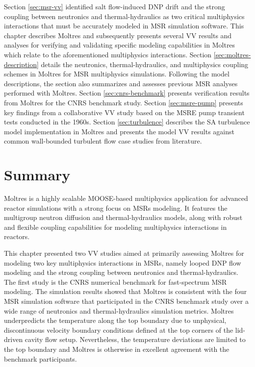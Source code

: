 Section \ref{sec:msr-vv} identified salt flow-induced \gls{DNP} drift and the strong coupling
between neutronics and thermal-hydraulics as two critical multiphysics interactions that must be
accurately modeled in \gls{MSR} simulation software. This chapter describes Moltres and
subsequently presents several \gls{VV} results and analyses for verifying and validating specific
modeling capabilities in Moltres which relate to the aforementioned multiphysics interactions.
Section \ref{sec:moltres-description} details the neutronics, thermal-hydraulics, and multiphysics
coupling schemes in Moltres for \gls{MSR} multiphysics simulations. Following the model
descriptions, the section also summarizes and assesses previous \gls{MSR} analyses
performed with Moltres. Section \ref{sec:cnrs-benchmark} presents verification results from Moltres
for the CNRS benchmark study. Section \ref{sec:msre-pump} presents key findings from a
collaborative \gls{VV} study based on the \gls{MSRE} pump transient tests conducted in the 1960s.
Section \ref{sec:turbulence} describes the \gls{SA} turbulence model implementation in
Moltres and presents the model \gls{VV} results against common wall-bounded turbulent flow case
studies from literature.








\FloatBarrier

\section{Summary}

Moltres is a highly scalable \gls{MOOSE}-based multiphysics application for advanced reactor
simulations with a strong focus on \glspl{MSR} modeling. It features the multigroup neutron
diffusion and thermal-hydraulics models, along with robust and flexible coupling capabilities for
modeling multiphysics interactions in reactors.

This chapter presented two \gls{VV} studies aimed at primarily assessing Moltres for modeling
two key multiphysics interactions in \glspl{MSR}, namely looped \gls{DNP} flow modeling and the
strong coupling between neutronics and thermal-hydraulics. The first study is the CNRS numerical
benchmark for fast-spectrum \gls{MSR} modeling. The simulation results showed that Moltres is
consistent with the four \gls{MSR} simulation software that participated in the CNRS benchmark
study \cite{tiberga_results_2020} over a wide range of neutronics and thermal-hydraulics simulation
metrics. Moltres underpredicts the temperature along the top boundary due to unphysical,
discontinuous velocity boundary conditions defined at the top corners of the lid-driven cavity
flow setup. Nevertheless, the temperature deviations are limited to the top boundary and Moltres
is otherwise in excellent agreement with the benchmark participants.

